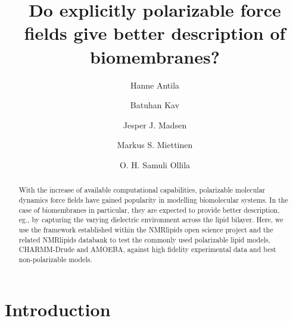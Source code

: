 \documentclass[journal=jacsat,manuscript=article,layout=singlecolumn]{achemso}
\author{Hanne Antila}
\author{Batuhan Kav}
\affiliation{Forschungszentrum Juelich, Germany}
\author{Jesper J. Madsen}
\author{Markus S. Miettinen}
\author{O. H. Samuli Ollila}
\title{Do explicitly polarizable force fields give better description of biomembranes?}
\begin{document}


\begin{abstract}
With the increase of available computational capabilities, polarizable molecular dynamics force fields have gained popularity in modelling biomolecular systems. In the case of biomembranes in particular, they are expected to provide better description, eg., by capturing the varying dielectric environment across the lipid bilayer. Here, we use the framework established within the NMRlipids open science project and the related NMRlipids databank to test the commonly used polarizable lipid models, CHARMM-Drude and AMOEBA, against high fidelity experimental data and best non-polarizable models. 
	
	
\end{abstract}

\section{Introduction}
\end{document}
